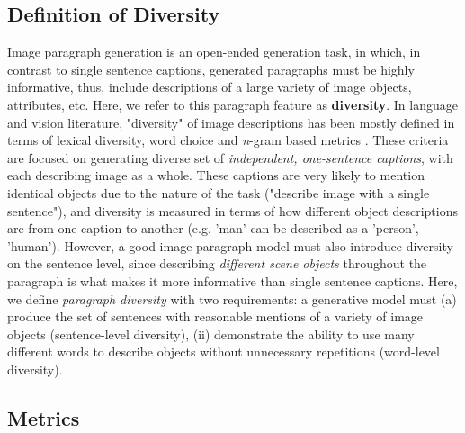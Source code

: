 \documentclass[11pt,a4paper]{article}
\begin{document}
\subsection{Definition of Diversity}
Image paragraph generation is an open-ended generation task, in which, in contrast to single sentence captions, generated paragraphs must be highly informative, thus, include descriptions of a large variety of image objects, attributes, etc.
Here, we refer to this paragraph feature as \textbf{diversity}.
In language and vision literature, "diversity" of image descriptions has been mostly defined in terms of lexical diversity, word choice and \textit{n}-gram based metrics \cite{Devlin2015, Vijayakumar2016, Lindh2018, VanMiltenburg2018}.
These criteria are focused on generating diverse set of \textit{independent, one-sentence captions}, with each describing image as a whole.
These captions are very likely to mention identical objects due to the nature of the task ("describe image with a single sentence"), and diversity is measured in terms of how different object descriptions are from one caption to another (e.g. 'man' can be described as a 'person', 'human').
However, a good image paragraph model must also introduce diversity on the sentence level, since describing \textit{different scene objects} throughout the paragraph is what makes it more informative than single sentence captions.
Here, we define \textit{paragraph diversity} with two requirements: a generative model must (a) produce the set of sentences with reasonable mentions of a variety of image objects (sentence-level diversity), (ii) demonstrate the ability to use many different words to describe objects without unnecessary repetitions (word-level diversity).
\fi


\subsection{Metrics}
\end{document}
